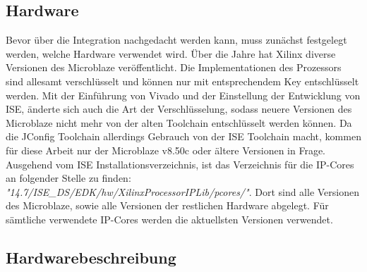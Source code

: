 \subsection{Hardware}
Bevor über die Integration nachgedacht werden kann, muss zunächst festgelegt werden, welche Hardware verwendet wird. Über die Jahre hat Xilinx diverse Versionen des Microblaze veröffentlicht. Die Implementationen des Prozessors sind allesamt verschlüsselt und können nur mit entsprechendem Key entschlüsselt werden. Mit der Einführung von Vivado und der Einstellung der Entwicklung von ISE, änderte sich auch die Art der Verschlüsselung, sodass neuere Versionen des Microblaze nicht mehr von der alten Toolchain entschlüsselt werden können. Da die JConfig Toolchain allerdings Gebrauch von der ISE Toolchain macht, kommen für diese Arbeit nur der Microblaze v8.50c oder ältere Versionen in Frage.\\
Ausgehend vom ISE Installationsverzeichnis, ist das Verzeichnis für die IP-Cores an folgender Stelle zu finden: \textit{"14.7/ISE\_DS/EDK/hw/XilinxProcessorIPLib/pcores/"}. Dort sind alle Versionen des Microblaze, sowie alle Versionen der restlichen Hardware abgelegt. Für sämtliche verwendete IP-Cores werden die aktuellsten Versionen verwendet.
\subsection{Hardwarebeschreibung}
